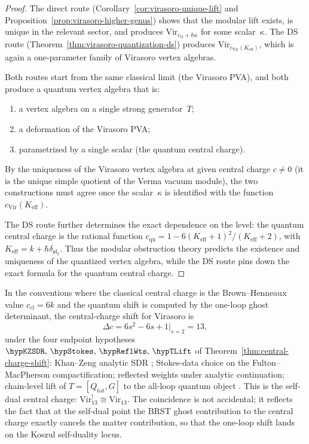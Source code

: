 \begin{proof}
The direct route (Corollary~\ref{cor:virasoro-unique-lift} and
Proposition~\ref{prop:virasoro-higher-genus}) shows that the modular
lift exists, is unique in the relevant sector, and produces
$\mathrm{Vir}_{c_{\mathrm{cl}}+\hbar\kappa}$ for some scalar~$\kappa$.
The DS route (Theorem~\ref{thm:virasoro-quantization-ds}) produces
$\mathrm{Vir}_{c_{\mathrm{Vir}}(K_{\mathrm{eff}})}$, which is again a
one-parameter family of Virasoro vertex algebras.

Both routes start from the same classical limit (the Virasoro PVA), and
both produce a quantum vertex algebra that is:
\begin{enumerate}[leftmargin=2.4em]
\item a vertex algebra on a single strong generator~$T$;
\item a deformation of the Virasoro PVA;
\item parametrized by a single scalar (the quantum central charge).
\end{enumerate}
By the uniqueness of the Virasoro vertex algebra at given central charge
$c\neq 0$ (it is the unique simple quotient of the Verma vacuum module),
the two constructions must agree once the scalar~$\kappa$ is identified
with the function $c_{\mathrm{Vir}}(K_{\mathrm{eff}})$.

The DS route further determines the exact dependence on the level: the
quantum central charge is the rational function
$c_{\mathrm{qu}} = 1 - 6(K_{\mathrm{eff}}+1)^2/(K_{\mathrm{eff}}+2)$,
with $K_{\mathrm{eff}} = k + \hbar\delta_{\mathfrak{sl}_2}$. Thus
the modular obstruction theory predicts the existence and uniqueness
of the quantized vertex algebra, while the DS route pins down the exact
formula for the quantum central charge.
\end{proof}

\begin{remark}[The shift $\Delta c = 13$;
\ClaimStatusConditional{} on
$\hypKZSDR,\,\hypStokes,\,\hypReflWts,\,\hypTLift$]
\label{rem:virasoro-shift-13}
In the conventions where the classical central charge is the
Brown--Henneaux value $c_{\mathrm{cl}} = 6k$ and the quantum shift
is computed by the one-loop ghost determinant, the central-charge shift
for Virasoro is
\[
\Delta c = 6s^2 - 6s + 1\big|_{s=2} = 13,
\]
under the four endpoint hypotheses
$\hypKZSDR,\,\hypStokes,\,\hypReflWts,\,\hypTLift$
of Theorem~\ref{thm:central-charge-shift}: Khan--Zeng analytic SDR
\cite{KZ25}; Stokes-data choice on the Fulton--MacPherson compactification;
reflected weights under analytic continuation; chain-level lift of
$T = [Q_{\mathrm{tot}}, G]$ to the all-loop quantum object
\cite{Costello2011Renorm,CG17,LurieHA}.
This is the self-dual central charge: $\mathrm{Vir}_{13}^! \cong
\mathrm{Vir}_{13}$. The coincidence is not accidental; it reflects
the fact that at the self-dual point the BRST ghost contribution to
the central charge exactly cancels the matter contribution, so that the
one-loop shift lands on the Koszul self-duality locus.
\end{remark}

